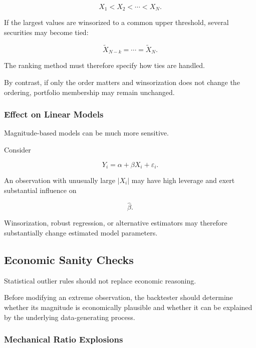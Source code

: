 \documentclass[11pt,a4paper]{article}
\begin{document}
\begin{equation}
X_1<X_2<\cdots<X_N.
\end{equation}

If the largest values are winsorized to a common upper threshold, several
securities may become tied:

\begin{equation}
\widetilde{X}_{N-k}
=
\cdots
=
\widetilde{X}_{N}.
\end{equation}

The ranking method must therefore specify how ties are handled.

By contrast, if only the order matters and winsorization does not change the
ordering, portfolio membership may remain unchanged.


\subsubsection{Effect on Linear Models}

Magnitude-based models can be much more sensitive.

Consider

\begin{equation}
Y_i
=
\alpha
+
\beta X_i
+
\varepsilon_i.
\end{equation}

An observation with unusually large $|X_i|$ may have high leverage and exert
substantial influence on

\begin{equation}
\widehat{\beta}.
\end{equation}

Winsorization, robust regression, or alternative estimators may therefore
substantially change estimated model parameters.


\subsection{Economic Sanity Checks}
\label{subsec:economic_sanity_checks}

Statistical outlier rules should not replace economic reasoning.

Before modifying an extreme observation, the backtester should determine
whether its magnitude is economically plausible and whether it can be explained
by the underlying data-generating process.


\subsubsection{Mechanical Ratio Explosions}
\end{document}
